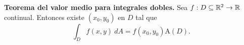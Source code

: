 
\begin{theorem}
    \textbf{Teorema del valor medio para integrales dobles.}   Sea $f:D\subseteq\mathbb{R}^2\to\mathbb{R}$ continual.  Entonces existe $(x_0,y_0)$ en $D$ tal que
    \[
        \int_D f(x,y)\:dA=f(x_0,y_0)\text{A}(D).
    \]
\end{theorem}
